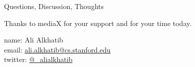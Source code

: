 \documentclass[presentation]{subfiles}
\begin{document}
  \begin{frame}{Questions, Discussion, Thoughts}

      Thanks to mediaX for your support and for your time today.

  
      name: {Ali Alkhatib} \\
      email: \href{mailto:ali.alkhatib@cs.stanford.edu}{ali.alkhatib@cs.stanford.edu} \\
      twitter: \href{https://twitter.com/_alialkhatib}{@\_alialkhatib} \\
  \end{frame}
\end{document}
